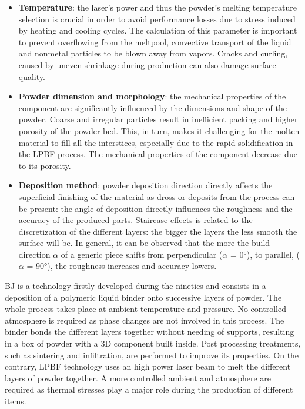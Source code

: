 \begin{itemize}
    \item \textbf{Temperature}: the laser's power and thus the powder's melting temperature selection is crucial in order to avoid performance losses due to stress induced by heating and cooling cycles. The calculation of this parameter is important to prevent overflowing from the meltpool, convective transport of the liquid and nonmetal particles to be blown away from vapors. Cracks and curling, caused by uneven shrinkage during production can also damage surface quality\cite{lpbf_accuracy}. 
    \item  \textbf{Powder dimension and morphology}: the mechanical properties of the component are significantly influenced by the dimensions and shape of the powder. Coarse and irregular particles result in inefficient packing and higher porosity of the powder bed. This, in turn, makes it challenging for the molten material to fill all the interstices, especially due to the rapid solidification in the LPBF process. The mechanical properties of the component decrease due to its porosity\cite{dimension_powder}.
    \item  \textbf{Deposition method}: powder deposition direction directly affects the superficial finishing of the material as dross or deposits from the process can be present: the angle of deposition directly influences the roughness and the accuracy of the produced parts. Staircase effects is related to the discretization of the different layers: the bigger the layers the less smooth the surface will be. In general, it can be observed that the more the build direction $\alpha$ of a generic piece shifts from perpendicular ($\alpha$ = 0°), to parallel, ($\alpha$ = 90°), the roughness increases and accuracy lowers\cite{tesi_dottorato}.
\end{itemize}


BJ is a technology firstly developed during the nineties and consists in a deposition of a polymeric liquid binder onto successive layers of powder. The whole process takes place at ambient temperature and pressure. No controlled atmosphere is required as phase changes are not involved in this process. The binder bonds the different layers together without needing of supports, resulting in a box of powder with a 3D component built inside. Post processing treatments, such as sintering and infiltration, are performed to improve its properties\cite{bj_inconel}. On the contrary, LPBF technology uses an high power laser beam to melt the different layers of powder together. A more controlled ambient and atmosphere are required as thermal stresses play a major role during the production of different items\cite{materials_and_desing}.

